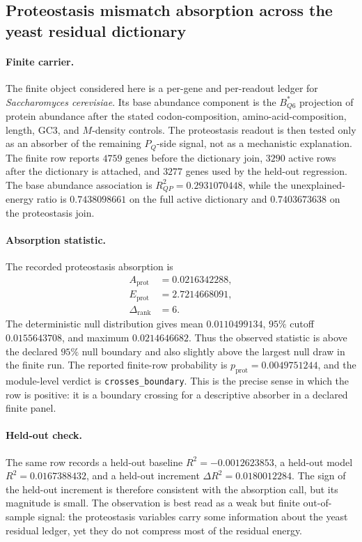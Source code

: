 
\subsection{Proteostasis mismatch absorption across the yeast residual dictionary}
\label{sec:bioreality-proteostasis-mismatch-absorption}

\paragraph{Finite carrier.}
The finite object considered here is a per-gene and per-readout ledger for \textit{Saccharomyces cerevisiae}.  Its base abundance component is the $B^{*}_{Q6}$ projection of protein abundance after the stated codon-composition, amino-acid-composition, length, GC3, and $M$-density controls.  The proteostasis readout is then tested only as an absorber of the remaining $P_Q$-side signal, not as a mechanistic explanation.  The finite row reports $4759$ genes before the dictionary join, $3290$ active rows after the dictionary is attached, and $3277$ genes used by the held-out regression.  The base abundance association is $R^2_{QP}=0.2931070448$, while the unexplained-energy ratio is $0.7438098661$ on the full active dictionary and $0.7403673638$ on the proteostasis join.

\paragraph{Absorption statistic.}
The recorded proteostasis absorption is
$$
\begin{aligned}
A_{\mathrm{prot}} &= 0.0216342288,\\
E_{\mathrm{prot}} &= 2.7214668091,\\
\Delta_{\mathrm{rank}} &= 6.
\end{aligned}
$$
The deterministic null distribution gives mean $0.0110499134$, $95\%$ cutoff $0.0155643708$, and maximum $0.0214646682$.  Thus the observed statistic is above the declared $95\%$ null boundary and also slightly above the largest null draw in the finite run.  The reported finite-row probability is $p_{\mathrm{prot}}=0.0049751244$, and the module-level verdict is \texttt{crosses\_boundary}.  This is the precise sense in which the row is positive: it is a boundary crossing for a descriptive absorber in a declared finite panel.

\paragraph{Held-out check.}
The same row records a held-out baseline $R^2=-0.0012623853$, a held-out model $R^2=0.0167388432$, and a held-out increment $\Delta R^2=0.0180012284$.  The sign of the held-out increment is therefore consistent with the absorption call, but its magnitude is small.  The observation is best read as a weak but finite out-of-sample signal: the proteostasis variables carry some information about the yeast residual ledger, yet they do not compress most of the residual energy.

